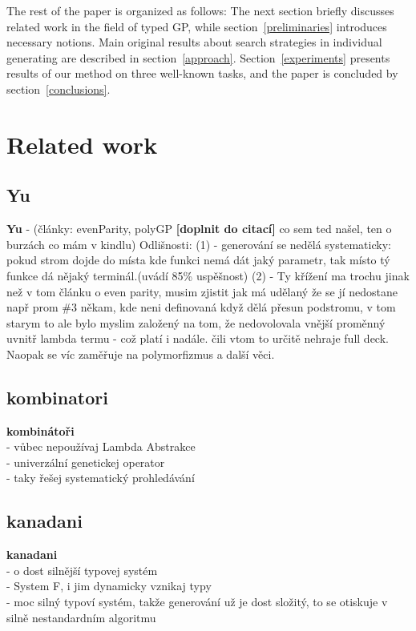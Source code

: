 \documentclass{llncs}
\begin{document}

The rest of the paper is organized as follows: The next section briefly discusses related work in the field of typed GP, while section~\ref{preliminaries} introduces necessary notions. Main original results about search strategies in individual generating are described in section~\ref{approach}. Section~\ref{experiments} presents results of our method on three well-known tasks, and the paper is concluded by section~\ref{conclusions}.


\section{Related work}
\label{related}
\subsection{Yu}
\textbf{Yu} - (články: evenParity, polyGP
\textbf{[doplnit do citací]}
 co sem ted našel, ten o burzách co mám v kindlu)
Odlišnosti:
(1) - generování se nedělá systematicky: pokud strom dojde do místa
kde funkci nemá dát jaký parametr, tak místo tý funkce dá nějaký 
terminál.(uvádí 85\% uspěšnost)  
(2) - Ty křížení ma trochu jinak než v tom článku o even parity,
musim zjistit jak má udělaný že se jí nedostane např prom \#3 někam,
kde neni definovaná když dělá přesun podstromu, v tom starym to ale 
bylo myslim založený na tom, že nedovolovala vnější proměnný uvnitř
lambda termu - což platí i nadále. čili vtom to určitě nehraje full deck.
Naopak se víc zaměřuje na polymorfizmus a další věci.

\subsection{kombinatori}

\textbf{kombinátoři} \\
- vůbec nepoužívaj Lambda Abstrakce\\
- univerzální genetickej operator\\
- taky řešej systematický prohledávání


\subsection{kanadani}

\textbf{kanadani}\\ 
- o dost silnější typovej systém\\
- System F, i jim dynamicky vznikaj typy\\
- moc silný typoví systém, takže generování už je dost
  složitý, to se otiskuje v silně nestandardním algoritmu
\end{document}

